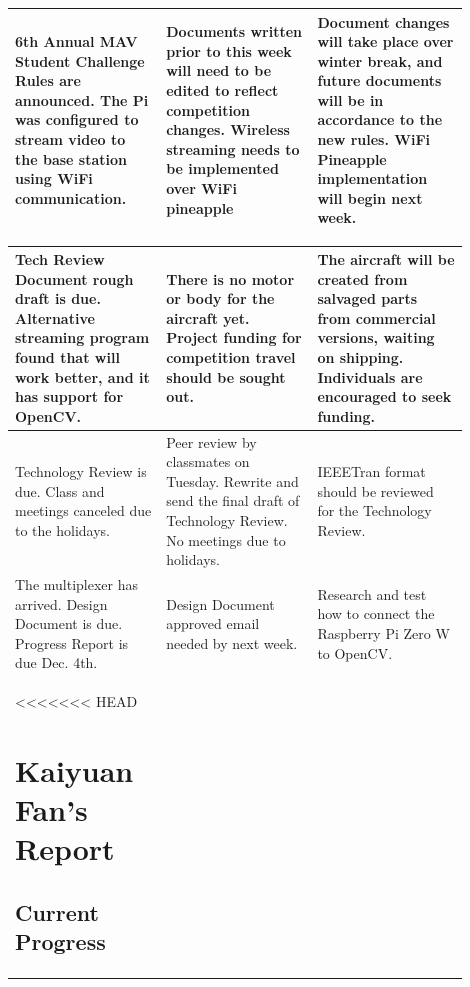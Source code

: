 \documentclass[onecolumn, draftclsnofoot,10pt, compsoc]{IEEEtran}
\begin{document}
\begin{center}
\begin{tabular}{|p{0.3\linewidth}|p{0.3\linewidth}|p{0.3\linewidth}|}
		\hline
         6th Annual MAV Student Challenge Rules are announced. The Pi was configured to stream video to the base station using WiFi communication. & Documents written prior to this week will need to be edited to reflect competition changes. Wireless streaming needs to be implemented over WiFi pineapple & Document changes will take place over winter break, and future documents will be in accordance to the new rules. WiFi Pineapple implementation will begin next week. \\
		\hline
    \end{tabular}
\end{center}

\begin{center}
    \begin{tabular}{|p{0.3\linewidth}|p{0.3\linewidth}|p{0.3\linewidth}|}
        		\hline
        Tech Review Document rough draft is due. Alternative streaming program found that will work better, and it has support for OpenCV. & There is no motor or body for the aircraft yet. Project funding for competition travel should be sought out. & The aircraft will be created from salvaged parts from commercial versions, waiting on shipping. Individuals are encouraged to seek funding. \\
		\hline
         Technology Review is due. Class and meetings canceled due to the holidays. & Peer review by classmates on Tuesday. Rewrite and send the final draft of Technology Review. No meetings due to holidays. & IEEETran format should be reviewed for the Technology Review.\\
		\hline
         The multiplexer has arrived. Design Document is due. Progress Report is due Dec. 4th. & Design Document approved email needed by next week. & Research and test how to connect the Raspberry Pi Zero W to OpenCV.   \\

<<<<<<< HEAD
\section{Kaiyuan Fan's Report}


\subsection{Current Progress}



\end{tabular}
\end{center}
\end{document}
